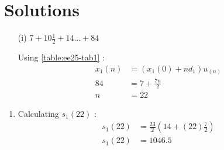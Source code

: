 \documentclass[journal,12pt,onecolumn]{IEEEtran}
\theoremstyle{remark}
\begin{document}
\section{Solutions}

\begin{enumerate}
\item[(i)]
$ 7 + 10\frac{1}{2} + 14 ... + 84$
\vspace{0.5cm}

Using \ref{table:ee25-tab1} :
\begin{align}
x_1(n) &= (x_1(0) + nd_1)u_{(n)}\\
84 &= 7+\frac{7n}{2}\\
n &= 22
\end{align}
\end{enumerate}

\begin{enumerate}
\item 
Calculating $s_1(22)$ : 
\begin{align}
    s_1{(22)} &= \frac{23}{2}(14+(22)\frac{7}{2})\\
    s_1{(22)} &= 1046.5
    \end{align}
    \end{enumerate}
    
\end{document}
